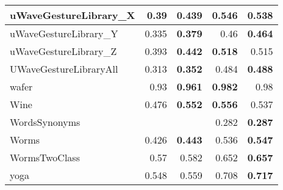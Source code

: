 \begin{longtable}{|l||r|r||r|r|}
\hline
uWaveGestureLibrary\_X &
0.39 &
\cellcolor[rgb]{ .973,  .796,  .678} \textbf{0.439} &
\cellcolor[rgb]{ .973,  .796,  .678} \textbf{0.546} &
0.538
\bigstrut\\
\hline
\rowcolor[rgb]{ .851,  .851,  .851} uWaveGestureLibrary\_Y &
0.335 &
\cellcolor[rgb]{ .973,  .796,  .678} \textbf{0.379} &
0.46 &
\cellcolor[rgb]{ .973,  .796,  .678} \textbf{0.464}
\bigstrut\\
\hline
uWaveGestureLibrary\_Z &
0.393 &
\cellcolor[rgb]{ .973,  .796,  .678} \textbf{0.442} &
\cellcolor[rgb]{ .973,  .796,  .678} \textbf{0.518} &
0.515
\bigstrut\\
\hline
\rowcolor[rgb]{ .851,  .851,  .851} UWaveGestureLibraryAll &
0.313 &
\cellcolor[rgb]{ .973,  .796,  .678} \textbf{0.352} &
0.484 &
\cellcolor[rgb]{ .973,  .796,  .678} \textbf{0.488}
\bigstrut\\
\hline
wafer &
0.93 &
\cellcolor[rgb]{ .973,  .796,  .678} \textbf{0.961} &
\cellcolor[rgb]{ .973,  .796,  .678} \textbf{0.982} &
0.98
\bigstrut\\
\hline
\rowcolor[rgb]{ .851,  .851,  .851} Wine &
0.476 &
\cellcolor[rgb]{ .973,  .796,  .678} \textbf{0.552} &
\cellcolor[rgb]{ .973,  .796,  .678} \textbf{0.556} &
0.537
\bigstrut\\
\hline
WordsSynonyms &
&
&
0.282 &
\cellcolor[rgb]{ .973,  .796,  .678} \textbf{0.287}
\bigstrut\\
\hline
\rowcolor[rgb]{ .851,  .851,  .851} Worms &
0.426 &
\cellcolor[rgb]{ .973,  .796,  .678} \textbf{0.443} &
0.536 &
\cellcolor[rgb]{ .973,  .796,  .678} \textbf{0.547}
\bigstrut\\
\hline
WormsTwoClass &
0.57 &
0.582 &
0.652 &
\cellcolor[rgb]{ .973,  .796,  .678} \textbf{0.657}
\bigstrut\\
\hline
\rowcolor[rgb]{ .851,  .851,  .851} yoga &
0.548 &
0.559 &
0.708 &
\cellcolor[rgb]{ .973,  .796,  .678} \textbf{0.717}
\bigstrut\\
\hline
    \end{longtable}%
